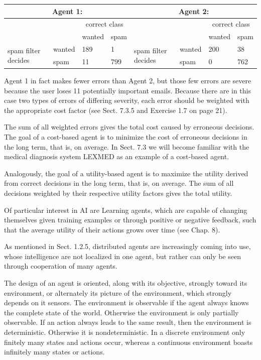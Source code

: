 \documentclass[10pt]{article}
\begin{document}
\begin{center}
\begin{tabular}{|l|l|l|l|l|l|l|l|}
\hline
\multicolumn{4}{|c|}{Agent 1:} & \multicolumn{4}{|c|}{Agent 2:} \\
\hline
\multicolumn{2}{|c|}{\multirow{2}{*}{}} & \multicolumn{2}{|c|}{correct class} & \multicolumn{2}{|c|}{\multirow{2}{*}{}} & \multicolumn{2}{|c|}{correct class} \\
\hline
 &  & wanted & spam &  &  & wanted & spam \\
\hline
\multirow{2}{*}{spam filter decides} & wanted & 189 & 1 & \multirow{2}{*}{spam filter decides} & wanted & 200 & 38 \\
\hline
 & spam & 11 & 799 &  & spam & 0 & 762 \\
\hline
\end{tabular}
\end{center}

Agent 1 in fact makes fewer errors than Agent 2, but those few errors are severe because the user loses 11 potentially important emails. Because there are in this case two types of errors of differing severity, each error should be weighted with the appropriate cost factor (see Sect. 7.3.5 and Exercise 1.7 on page 21).

The sum of all weighted errors gives the total cost caused by erroneous decisions. The goal of a cost-based agent is to minimize the cost of erroneous decisions in the long term, that is, on average. In Sect. 7.3 we will become familiar with the medical diagnosis system LEXMED as an example of a cost-based agent.

Analogously, the goal of a utility-based agent is to maximize the utility derived from correct decisions in the long term, that is, on average. The sum of all decisions weighted by their respective utility factors gives the total utility.

Of particular interest in AI are Learning agents, which are capable of changing themselves given training examples or through positive or negative feedback, such that the average utility of their actions grows over time (see Chap. 8).

As mentioned in Sect. 1.2.5, distributed agents are increasingly coming into use, whose intelligence are not localized in one agent, but rather can only be seen through cooperation of many agents.

The design of an agent is oriented, along with its objective, strongly toward its environment, or alternately its picture of the environment, which strongly depends on it sensors. The environment is observable if the agent always knows the complete state of the world. Otherwise the environment is only partially observable. If an action always leads to the same result, then the environment is
 deterministic. Otherwise it is nondeterministic. In a discrete environment only finitely many states and actions occur, whereas a continuous environment boasts infinitely many states or actions.
\end{document}
